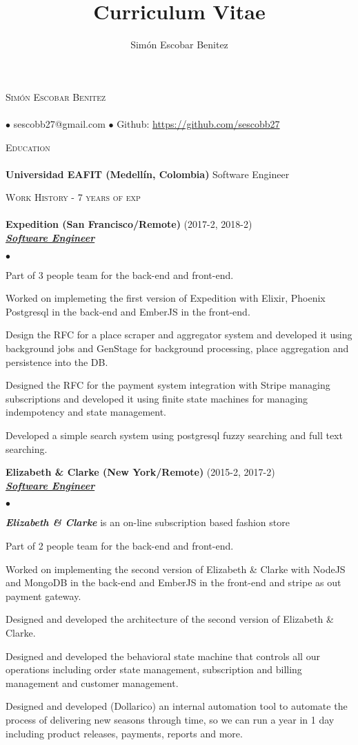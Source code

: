 \documentclass[a4paper]{article}
\title{Curriculum Vitae}
\author{Sim\'on Escobar Benitez}
\newcommand{\lineunder}{\vspace*{-8pt} \\ \hspace*{-18pt} \hrulefill \\}
\newcommand{\header}[1]{{\hspace*{-15pt}\vspace*{6pt}
\textsc{#1}} \vspace*{-6pt} \lineunder}
\newcommand{\employer}[3]{{
\textbf{#1} (#2)\\ \underline{\textbf{\emph{#3}}}\\ }}
\newcommand{\contact}[2]{
\vspace*{-8pt}
\begin{center}
{\LARGE \scshape {#1}} \lineunder #2
\end{center}
\vspace*{-8pt} }
\newenvironment{achievements}{\begin{list}{$\bullet$}{\topsep 0pt \itemsep
-2pt}}{\vspace*{4pt}\end{list}}
\newcommand{\schoolwithcourses}[2]{
\textbf{#1} #2
\vspace*{5pt} }
\newcommand{\emphasys}[1]{\textbf{\emph{#1}}}
\begin{document}
\small
\smallskip
\vspace*{-44pt}
\contact{Sim\'on Escobar Benitez} { $\bullet$ sescobb27@gmail.com $\bullet$ Github: \url{https://github.com/sescobb27} }
\header{Education}
\schoolwithcourses{Universidad EAFIT (Medell\'in, Colombia)}{Software Engineer}

\header{Work History - 7 years of exp}

\employer{ Expedition (San Francisco/Remote)}{2017-2, 2018-2}{Software Engineer}
\begin{achievements}
\item Part of 3 people team for the back-end and front-end.
\item Worked on implemeting the first version of Expedition with Elixir, Phoenix Postgresql in the back-end and EmberJS in the front-end.
\item Design the RFC for a place scraper and aggregator system and developed it using  background jobs and GenStage for background processing, place aggregation and persistence into the DB.
\item Designed the RFC for the payment system integration with Stripe managing subscriptions and developed it using finite state machines for managing indempotency and state management.
\item Developed a simple search system using postgresql fuzzy searching and full text searching.
\end{achievements}

\employer{ Elizabeth \& Clarke (New York/Remote)}{2015-2, 2017-2}{Software Engineer}
\begin{achievements}
\item \emphasys{Elizabeth \& Clarke} is an on-line subscription based fashion store
\item Part of 2 people team for the back-end and front-end.
\item Worked on implementing the second version of Elizabeth \& Clarke with NodeJS and MongoDB in the back-end and EmberJS in the front-end and stripe as out payment gateway.
\item Designed and developed the architecture of the second version of Elizabeth \& Clarke.
\item Designed and developed the behavioral state machine that controls all our operations including order state management, subscription and billing management and customer management.
\item Designed and developed (Dollarico) an internal automation tool to automate the process of delivering new seasons through time, so we can run a year in 1 day including product releases, payments, reports and more.
\end{achievements}
\end{document}
